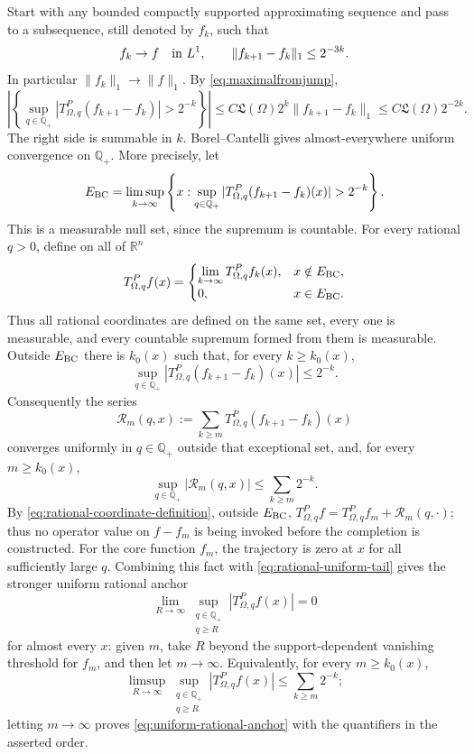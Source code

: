\documentclass[11pt]{article}
\numberwithin{equation}{section}
\theoremstyle{remark}
\theoremstyle{definition}
\newcommand{\norm}[1]{\lVert #1\rVert}
\begin{document}
Start with any bounded compactly supported approximating sequence and
pass to a subsequence, still denoted by $f_k$, such that
\[
 f_k\to f\quad\hbox{in }L^1,\qquad
 \norm{f_{k+1}-f_k}_1\le2^{-3k}.
\]
In particular $\|f_k\|_1\to\|f\|_1$.  By
\eqref{eq:maximalfromjump},
\[
 \left|\left\{
 \sup_{q\in\mathbb Q_+}|T^P_{\Omega,q}(f_{k+1}-f_k)|>2^{-k}
 \right\}\right|
 \le C\mathfrak L(\Omega)2^k\|f_{k+1}-f_k\|_1
 \le C\mathfrak L(\Omega)2^{-2k}.
\]
The right side is summable in $k$.
Borel--Cantelli gives almost-everywhere uniform convergence on
$\mathbb Q_+$.  More precisely, let
\[
 E_{\rm BC}=\limsup_{k\to\infty}\left\{x:
  \sup_{q\in\mathbb Q_+}
  |T^P_{\Omega,q}(f_{k+1}-f_k)(x)|>2^{-k}\right\}.
\]
This is a measurable null set, since the supremum is countable.  For every
rational \(q>0\), define on all of \(\mathbb R^n\)
\begin{equation}\label{eq:rational-coordinate-definition}
 T^P_{\Omega,q}f(x)=
 \begin{cases}
  \displaystyle\lim_{k\to\infty}T^P_{\Omega,q}f_k(x),&x\notin E_{\rm BC},\\
  0,&x\in E_{\rm BC}.
 \end{cases}
\end{equation}
Thus all rational coordinates are defined on the same set, every one is
measurable, and every countable supremum formed from them is measurable.
Outside \(E_{\rm BC}\) there is $k_0(x)$ such that, for every
$k\ge k_0(x)$,
\[
 \sup_{q\in\mathbb Q_+}
 |T^P_{\Omega,q}(f_{k+1}-f_k)(x)|\le2^{-k}.
\]
Consequently the series
\[
 \mathcal R_m(q,x)
 :=\sum_{k\ge m}T^P_{\Omega,q}(f_{k+1}-f_k)(x)
\]
converges uniformly in $q\in\mathbb Q_+$ outside that exceptional set,
and, for every $m\ge k_0(x)$,
\begin{equation}\label{eq:rational-uniform-tail}
 \sup_{q\in\mathbb Q_+}
 |\mathcal R_m(q,x)|
 \le\sum_{k\ge m}2^{-k}.
\end{equation}
By \eqref{eq:rational-coordinate-definition}, outside \(E_{\rm BC}\),
$T^P_{\Omega,q}f=T^P_{\Omega,q}f_m+\mathcal R_m(q,\cdot)$; thus no
operator value on $f-f_m$ is being invoked before the completion is
constructed.
For the core function $f_m$, the trajectory is zero at $x$ for all
sufficiently large $q$.  Combining this fact with
\eqref{eq:rational-uniform-tail} gives the stronger uniform rational anchor
\begin{equation}\label{eq:uniform-rational-anchor}
 \lim_{R\to\infty}
 \sup_{\substack{q\in\mathbb Q_+\\q\ge R}}
 |T^P_{\Omega,q}f(x)|=0
\end{equation}
for almost every $x$: given $m$, take $R$ beyond the support-dependent
vanishing threshold for $f_m$, and then let $m\to\infty$.  Equivalently,
for every $m\ge k_0(x)$,
\[
 \limsup_{R\to\infty}
 \sup_{\substack{q\in\mathbb Q_+\\q\ge R}}
 |T^P_{\Omega,q}f(x)|
 \le\sum_{k\ge m}2^{-k};
\]
letting $m\to\infty$ proves \eqref{eq:uniform-rational-anchor} with the
quantifiers in the asserted order.
\end{document}
